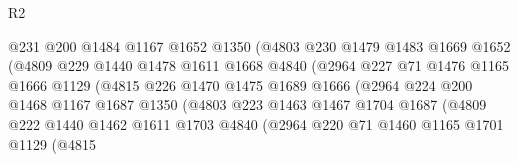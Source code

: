 \begin{lexlean}{R2}
\begin{coremodule}
                              @231
                              @200
                              @1484
                              @1167
                              @1652
                              @1350
                              (@4803
                                @230
                                @1479
                                @1483
                                @1669
                                @1652
                                (@4809
                                  @229
                                  @1440
                                  @1478
                                  @1611
                                  @1668
                                  @4840
                                  (@2964
                                    @227
                                    @71
                                    @1476
                                    @1165
                                    @1666
                                    @1129
                                    (@4815
                                      @226
                                      @1470
                                      @1475
                                      @1689
                                      @1666
                                      (@2964
                                        @224
                                        @200
                                        @1468
                                        @1167
                                        @1687
                                        @1350
                                        (@4803
                                          @223
                                          @1463
                                          @1467
                                          @1704
                                          @1687
                                          (@4809
                                            @222
                                            @1440
                                            @1462
                                            @1611
                                            @1703
                                            @4840
                                            (@2964
                                              @220
                                              @71
                                              @1460
                                              @1165
                                              @1701
                                              @1129
                                              (@4815

\end{coremodule}
\end{lexlean}
